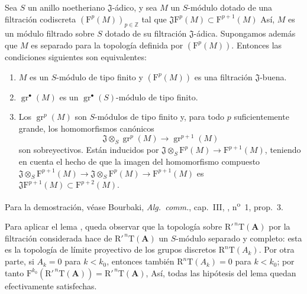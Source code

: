 \begin{lemma}[13.7.7.2]
\label{0.13.7.7.2}
\label{0.13.7.7.2-fr}
Sea $S$ un anillo noetheriano $\mathfrak J$-ádico, y sea $M$
un $S$-módulo dotado de una filtración codiscreta
$(\mathrm F^p(M))_{p\in\mathbb Z}$ tal que
$\mathfrak J\mathrm F^p(M)\subset\mathrm F^{p+1}(M)$
Así, $M$ es un módulo filtrado sobre $S$ dotado de su
filtración $\mathfrak J$-ádica.
Supongamos además que $M$ es separado para la topología definida por
$(\mathrm F^p(M))$.
Entonces las condiciones siguientes son equivalentes:
\begin{enumerate}
  \item[{\rm a)}] $M$ es un $S$-módulo de tipo finito y
  $(\mathrm F^p(M))$ es una filtración $\mathfrak J$-buena.
  \item[{\rm b)}] $\operatorname{gr}^\bullet(M)$ es un
  $\operatorname{gr}^\bullet(S)$-módulo de tipo finito.
  \item[{\rm c)}] Los $\operatorname{gr}^p(M)$ son $S$-módulos de
  tipo finito y, para todo $p$ suficientemente grande, los homomorfismos
  canónicos
  \begin{equation}
\label{0.13.7.7.3-fr}
\tag{13.7.7.3}
\mathfrak J\otimes_S\operatorname{gr}^p(M)\longrightarrow
\operatorname{gr}^{p+1}(M)
\end{equation}
  son sobreyectivos.
  Están inducidos por
  $\mathfrak J\otimes_S\mathrm F^p(M)\to\mathrm F^{p+1}(M)$, teniendo en cuenta el hecho
  de que la imagen del homomorfismo compuesto
  $\mathfrak J\otimes_S\mathrm F^{p+1}(M)\to
\mathfrak J\otimes_S\mathrm F^p(M)\to\mathrm F^{p+1}(M)$
  es
  $\mathfrak J\mathrm F^{p+1}(M)\subset\mathrm F^{p+2}(M)$.
\end{enumerate}
\end{lemma}

Para la demostración, véase Bourbaki, \emph{Alg.\ comm.}, cap.~III,
, n\textsuperscript{o}~1, prop.~3.

\begin{env}[13.7.7.4]
\label{0.13.7.7.4}
\label{0.13.7.7.4-fr}
Para aplicar el lema , queda observar que la
topología sobre $\mathrm R'^{\,n}\mathrm T(\mathbf A)$ por la filtración considerada hace de $\mathrm R'^{\,n}\mathrm T(\mathbf A)$ un $S$-módulo separado y completo:
esta es la topología de límite proyectivo de los grupos discretos
$\mathrm R^n\mathrm T(A_k)$.
Por otra parte, si $A_k=0$ para $k<k_0$, entonces también
$\mathrm R^n\mathrm T(A_k)=0$ para $k<k_0$; por tanto
$\mathrm F^{k_0}(\mathrm R'^{\,n}\mathrm T(\mathbf A))=
\mathrm R'^{\,n}\mathrm T(\mathbf A)$,
Así, todas las hipótesis del lema quedan efectivamente satisfechas.
\end{env}


